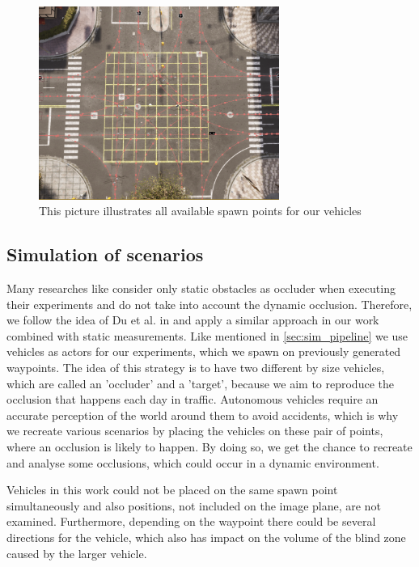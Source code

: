 \begin{figure} [h!]
    \centering
    \includegraphics[width=0.7\textwidth]{images/waypoints.png}
    \caption[Intersection waypoints]{This picture illustrates all available spawn points for our vehicles}
    \label{fig:waypoints}
\end{figure}
\newpage

\subsection{Simulation of scenarios} \label{sec:sim_stage}
Many researches like \cite{total_coverage_optimum, max_camera_coverage} consider only static obstacles as occluder when executing their experiments and do not take into account the dynamic occlusion. Therefore, we follow the idea of Du et al. in \cite{occlusion_degree_model} and apply a similar approach in our work combined with static measurements. Like mentioned in \ref{sec:sim_pipeline} we use vehicles as actors for our experiments, which we spawn on previously generated waypoints. The idea of this strategy is to have two different by size vehicles, which are called an 'occluder' and a 'target', because we aim to reproduce the occlusion that happens each day in traffic. Autonomous vehicles require an accurate perception of the world around them to avoid accidents, which is why we recreate various scenarios by placing the vehicles on these pair of points, where an occlusion is likely to happen. By doing so, we get the chance to recreate and analyse some occlusions, which could occur in a dynamic environment.

Vehicles in this work could not be placed on the same spawn point simultaneously and also positions, not included on the image plane, are not examined. Furthermore, depending on the waypoint there could be several directions for the vehicle, which also has impact on the volume of the blind zone caused by the larger vehicle. 

